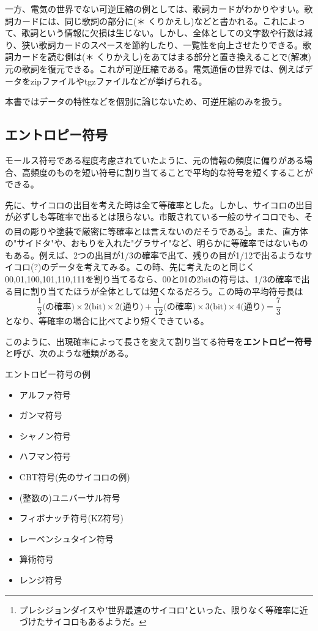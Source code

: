 一方、電気の世界でない可逆圧縮の例としては、歌詞カードがわかりやすい。歌詞カードには、同じ歌詞の部分に(＊ くりかえし)などと書かれる。これによって、歌詞という情報に欠損は生じない。しかし、全体としての文字数や行数は減り、狭い歌詞カードのスペースを節約したり、一覧性を向上させたりできる。歌詞カードを読む側は(＊ くりかえし)をあてはまる部分と置き換えることで(解凍)元の歌詞を復元できる。これが可逆圧縮である。電気通信の世界では、例えばデータをzipファイルやtgzファイルなどが挙げられる。

本書ではデータの特性などを個別に論じないため、可逆圧縮のみを扱う。

\subsection{エントロピー符号}
モールス符号である程度考慮されていたように、元の情報の頻度に偏りがある場合、高頻度のものを短い符号に割り当てることで平均的な符号を短くすることができる。

先に、サイコロの出目を考えた時は全て等確率とした。しかし、サイコロの出目が必ずしも等確率で出るとは限らない。市販されている一般のサイコロでも、その目の彫りや塗装で厳密に等確率とは言えないのだそうである\footnote{プレシジョンダイスや"世界最速のサイコロ"といった、限りなく等確率に近づけたサイコロもあるようだ。}。また、直方体の"サイドタ"や、おもりを入れた"グラサイ"など、明らかに等確率ではないものもある。例えば、2つの出目が1/3の確率で出て、残りの目が1/12で出るようなサイコロ(?)のデータを考えてみる。この時、先に考えたのと同じく00,01,100,101,110,111を割り当てるなら、00と01の2bitの符号は、1/3の確率で出る目に割り当てたほうが全体としては短くなるだろう。この時の平均符号長は
\[\frac{1}{3}\text{(の確率)}\times 2\text{(bit)} \times 2\text{(通り)}+\frac{1}{12}\text{(の確率)}\times 3\text{(bit)} \times 4\text{(通り)}=\frac{7}{3}\]
となり、等確率の場合に比べてより短くできている。

このように、出現確率によって長さを変えて割り当てる符号を\textbf{エントロピー符号}と呼び、次のような種類がある。
\begin{itembox}[l]{エントロピー符号の例}
\begin{multicols}{2}
\begin{itemize}
\item アルファ符号
\item ガンマ符号
\item シャノン符号
\item ハフマン符号
\item CBT符号(先のサイコロの例)
\item (整数の)ユニバーサル符号
\item フィボナッチ符号(KZ符号)
\item レーベンシュタイン符号
\item 算術符号
\item レンジ符号
\end{itemize}
\end{multicols}
\end{itembox}

